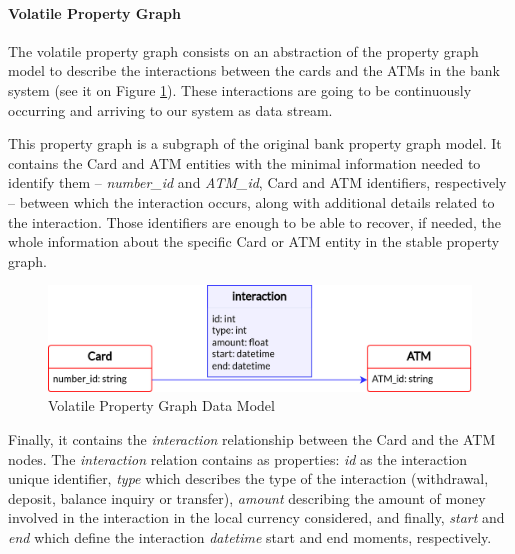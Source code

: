 \paragraph*{Volatile Property Graph\\}\label{section:volatile-pg}

The volatile property graph consists on an abstraction of the property graph model to describe the interactions between the cards and the ATMs in the bank system (see it on Figure \ref{img:pg-volatile}). These interactions are going to be continuously occurring and arriving to our system as data stream.

This property graph is a subgraph of the original bank property graph model. It contains the Card and ATM entities with the minimal information needed to identify them -- \emph{number\_id} and \emph{ATM\_id}, Card and ATM identifiers, respectively -- between which the interaction occurs, along with additional details related to the interaction. Those identifiers are enough to be able to recover, if needed, the whole information about the specific Card or ATM entity in the stable property graph.

\begin{figure}[h]
    \centering
    \includegraphics[scale = 0.8]{images/1-DataModel/schema-volatile.png}
    \caption{Volatile Property Graph Data Model}
    \label{img:pg-volatile}
\end{figure}

Finally, it contains the \emph{interaction} relationship between the Card and the ATM nodes. The \emph{interaction} relation contains as properties: \emph{id} as the interaction unique identifier, \emph{type} which describes the type of the interaction (withdrawal, deposit, balance inquiry or transfer), \emph{amount} describing the amount of money involved in the interaction in the local currency considered, and finally, \emph{start} and \emph{end} which define the interaction \emph{datetime} start and end moments, respectively. 


